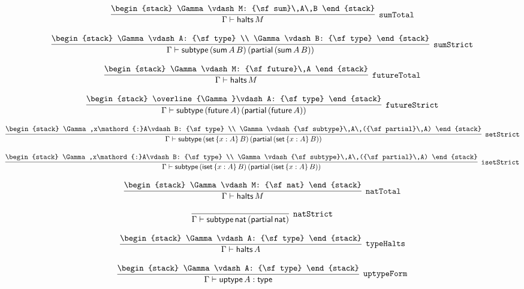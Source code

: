 \[
\infer[{\tt sumTotal}]{\Gamma \vdash {\sf halts}\,M}{
\begin{stack}
\Gamma \vdash M: {\sf sum}\,A\,B
\end{stack}}
\]

\[
\infer[{\tt sumStrict}]{\Gamma \vdash {\sf subtype}\,({\sf sum}\,A\,B)\,({\sf partial}\,({\sf sum}\,A\,B))}{
\begin{stack}
\Gamma \vdash A: {\sf type}
\\
\Gamma \vdash B: {\sf type}
\end{stack}}
\]

\[
\infer[{\tt futureTotal}]{\Gamma \vdash {\sf halts}\,M}{
\begin{stack}
\Gamma \vdash M: {\sf future}\,A
\end{stack}}
\]

\[
\infer[{\tt futureStrict}]{\Gamma \vdash {\sf subtype}\,({\sf future}\,A)\,({\sf partial}\,({\sf future}\,A))}{
\begin{stack}
\overline{\Gamma}\vdash A: {\sf type}
\end{stack}}
\]

\[
\infer[{\tt setStrict}]{\Gamma \vdash {\sf subtype}\,({\sf set}\,\{x : A\}\,B)\,({\sf partial}\,({\sf set}\,\{x : A\}\,B))}{
\begin{stack}
\Gamma ,x\mathord{:}A\vdash B: {\sf type}
\\
\Gamma \vdash {\sf subtype}\,A\,({\sf partial}\,A)
\end{stack}}
\]

\[
\infer[{\tt isetStrict}]{\Gamma \vdash {\sf subtype}\,({\sf iset}\,\{x : A\}\,B)\,({\sf partial}\,({\sf iset}\,\{x : A\}\,B))}{
\begin{stack}
\Gamma ,x\mathord{:}A\vdash B: {\sf type}
\\
\Gamma \vdash {\sf subtype}\,A\,({\sf partial}\,A)
\end{stack}}
\]

\[
\infer[{\tt natTotal}]{\Gamma \vdash {\sf halts}\,M}{
\begin{stack}
\Gamma \vdash M: {\sf nat}
\end{stack}}
\]

\[
\infer[{\tt natStrict}]{\Gamma \vdash {\sf subtype}\,{\sf nat}\,({\sf partial}\,{\sf nat})}{}
\]

\[
\infer[{\tt typeHalts}]{\Gamma \vdash {\sf halts}\,A}{
\begin{stack}
\Gamma \vdash A: {\sf type}
\end{stack}}
\]

\[
\infer[{\tt uptypeForm}]{\Gamma \vdash {\sf uptype}\,A: {\sf type}}{
\begin{stack}
\Gamma \vdash A: {\sf type}
\end{stack}}
\]

